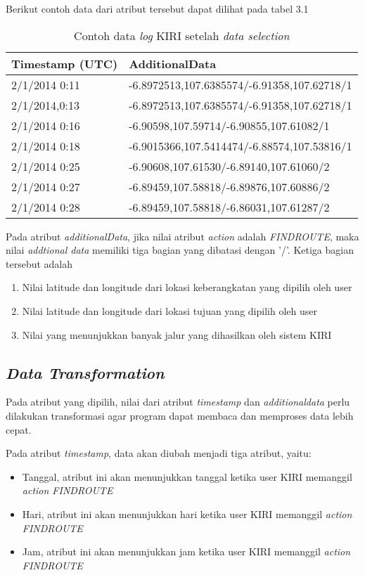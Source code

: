Berikut contoh data dari atribut tersebut dapat dilihat pada tabel 3.1
\begin{table}[h]
\caption{Contoh data \textsl{log} KIRI setelah \textsl{data selection}}
\begin{tabular}{|l|l|}
\hline
\textbf{Timestamp (UTC)} & \textbf{AdditionalData}                     \\ \hline
2/1/2014 0:11            & -6.8972513,107.6385574/-6.91358,107.62718/1 \\ \hline
2/1/2014,0:13            & -6.8972513,107.6385574/-6.91358,107.62718/1 \\ \hline
2/1/2014 0:16            & -6.90598,107.59714/-6.90855,107.61082/1     \\ \hline
2/1/2014 0:18            & -6.9015366,107.5414474/-6.88574,107.53816/1 \\ \hline
2/1/2014 0:25            & -6.90608,107.61530/-6.89140,107.61060/2     \\ \hline
2/1/2014 0:27            & -6.89459,107.58818/-6.89876,107.60886/2     \\ \hline
2/1/2014 0:28            & -6.89459,107.58818/-6.86031,107.61287/2     \\ \hline
\end{tabular}
\end{table}

Pada atribut \textsl{additionalData}, jika nilai atribut \textsl{action} adalah \textsl{FINDROUTE}, maka nilai \textsl{addtional data} memiliki tiga bagian yang dibatasi dengan '/'. Ketiga bagian tersebut adalah

\begin{enumerate}
	\item Nilai latitude dan longitude dari lokasi keberangkatan yang dipilih oleh user
	\item Nilai latitude dan longitude dari lokasi tujuan yang dipilih oleh user
	\item Nilai yang menunjukkan banyak jalur yang dihasilkan oleh sistem KIRI
\end{enumerate}

\subsection{\textsl{Data Transformation}}
Pada atribut yang dipilih, nilai dari atribut \textsl{timestamp} dan \textsl{additionaldata} perlu dilakukan transformasi agar program dapat membaca dan memproses data lebih cepat. 

Pada atribut \textsl{timestamp}, data akan diubah menjadi tiga atribut, yaitu:
\begin{itemize}
	\item Tanggal, atribut ini akan menunjukkan tanggal ketika user KIRI memanggil \textsl{action FINDROUTE}
	\item Hari, atribut ini akan menunjukkan hari ketika user KIRI memanggil \textsl{action FINDROUTE}
	\item Jam, atribut ini akan menunjukkan jam ketika user KIRI memanggil \textsl{action FINDROUTE}
\end{itemize}

